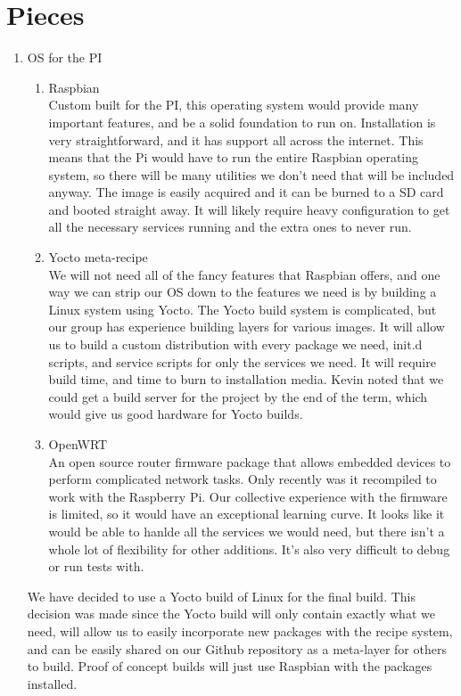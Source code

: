 \documentclass[12pt]{article}
\begin{document}
\section{Pieces}

\begin{enumerate}
    \item OS for the PI
        \begin{enumerate}
            \item Raspbian \\
                Custom built for the PI, this operating system would provide many important features, and be a solid foundation to run on. Installation is very straightforward, and it has support all across the internet. This means that the Pi would have to run the entire Raspbian operating system, so there will be many utilities we don't need that will be included anyway. The image is easily acquired and it can be burned to a SD card and booted straight away. It will likely require heavy configuration to get all the necessary services running and the extra ones to never run.
            \item Yocto meta-recipe \\
                We will not need all of the fancy features that Raspbian offers, and one way we can strip our OS down to the features we need is by building a Linux system using Yocto. The Yocto build system is complicated, but our group has experience building layers for various images. It will allow us to build a custom distribution with every package we need, init.d scripts, and service scripts for only the services we need. It will require build time, and time to burn to installation media. Kevin noted that we could get a build server for the project by the end of the term, which would give us good hardware for Yocto builds. 
            \item OpenWRT \\
                An open source router firmware package that allows embedded devices to perform complicated network tasks. Only recently was it recompiled to work with the Raspberry Pi. Our collective experience with the firmware is limited, so it would have an exceptional learning curve. It looks like it would be able to hanlde all the services we would need, but there isn't a whole lot of flexibility for other additions. It's also very difficult to debug or run tests with. 
        \end{enumerate}
        We have decided to use a Yocto build of Linux for the final build. This decision was made since the Yocto build will only contain exactly what we need, will allow us to easily incorporate new packages with the recipe system, and can be easily shared on our Github repository as a meta-layer for others to build. Proof of concept builds will just use Raspbian with the packages installed.

\end{enumerate}
\end{document}
